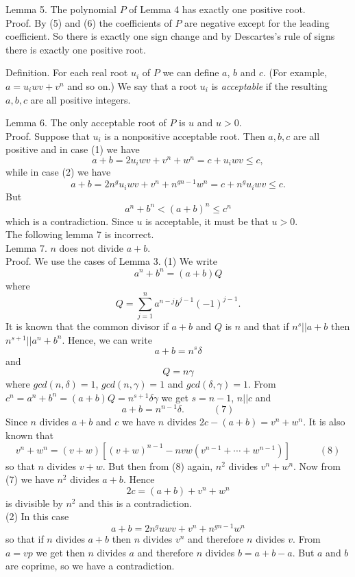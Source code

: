 \documentclass[12pt]{article}
\begin{document}
Lemma 5. The polynomial $P$ of Lemma 4 has exactly one positive root. \\
Proof. By (5) and (6) the coefficients of $P$ are negative except for the leading 
coefficient. So there is exactly one sign change and by Descartes's rule of signs
there is exactly one positive root.

Definition. For each real root $u_i$ of $P$ we can define $a$, $b$ and $c$. 
(For example, $a=u_iwv + v^n$ and so on.) We say that a root $u_i$ is
\emph{acceptable} if the resulting $a,b,c$ are all positive integers.

Lemma 6.   The only acceptable root
of $P$ is $u$ and $u>0.$ \\
Proof. Suppose that $u_i$ is a nonpositive acceptable root. Then $a,b,c$ are all
positive and in case (1) we have
$$
a+b = 2u_iwv + v^n + w^n = c + u_iwv \le c,
$$
while in case (2) we have
$$
a+b= 2n^gu_iwv + v^n + n^{gn-1}w^n = c + n^gu_iwv \le c.
$$
But
$$
a^n + b^n < (a+b)^n \le c^n 
$$
which is a contradiction. Since $u$ is acceptable, it must be that
$u>0$.\\

The following lemma 7 is incorrect. \\
Lemma 7.  $n$ does not divide $a+b$. \\
Proof.  We use the cases of Lemma 3. (1)  We write \\
$$
a^n + b^n = (a+b)Q
$$
where 
$$
Q=\sum_{j=1}^na^{n-j}b^{j-1}(-1)^{j-1}.
$$
It is known that the common divisor if $a+b$ and $Q$ is $n$ and that
if $n^s || a+b$ then $n^{s+1} || a^n + b^n$. 
Hence, we can write
$$
a+b = n^s \delta
$$
and 
$$
Q=n \gamma
$$
where $gcd(n,\delta) = 1$, $gcd(n, \gamma) =1$ and $gcd(\delta, \gamma) =1$.
From $c^n = a^n+b^n = (a+b)Q = n^{s+1}\delta \gamma$
we get $s=n-1$, $n||c$ and 
$$
a+b=n^{n-1}\delta . \quad \quad \quad (7)
$$
Since $n$ divides $a+b$ and $c$ we have $n$ divides $2c-(a+b) = v^n + w^n$.
It is also known that
$$
v^n + w^n = (v+w)[(v+w)^{n-1}-nvw(v^{n-1}+ \cdots + w^{n-1})] \quad \quad \quad (8)
$$
so that $n$ divides $v+w$. But then from (8) again, $n^2$ divides $v^n+w^n$.
Now from (7) we have $n^2$ divides $a+b$.
Hence  
$$
2c = (a+b)+ v^n + w^n
$$
is divisible by $n^2$ and this is a contradiction. \\
(2) In this case 
$$
a+b = 2n^guwv + v^n + n^{gn-1}w^n
$$
so that if $n$ divides $a+b$ then $n$ divides $v^n$ and therefore $n$ divides $v$. 
From $a=vp$ we get then $n$ divides $a$ and therefore $n$ divides $b=a+b-a$.
But $a$ and $b$ are coprime, so we have a contradiction.
\end{document}
